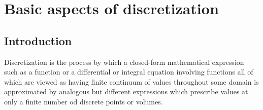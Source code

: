 \documentclass{report}
\begin{document}
 
\tableofcontents
\chapter{Basic aspects of discretization}
\section{Introduction}

Discretization is the process by which a closed-form mathematical expression such as a function 
or a differential or integral equation involving functions all of which are viewed as having 
finite continuum of values throughout some domain is approximated by analogous but different expressions which prescribe
values at only a finite number od discrete points or volumes.
\end{document}
